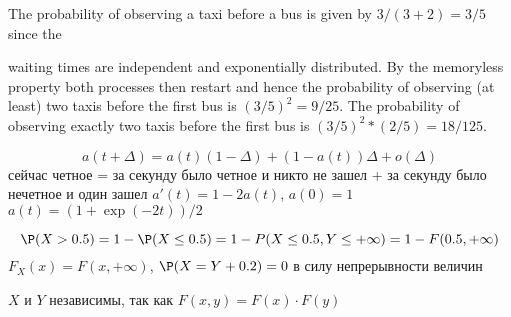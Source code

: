 \begin{solution}{7.7}
  The probability of observing a taxi before a bus is given by $3/(3+2)=3/5$ since the

  waiting times are independent and exponentially distributed. By the memoryless
  property both processes then restart and hence the probability of observing (at least)
  two taxis before the first bus is $(3/5)^2=9/25$. The probability of observing exactly
  two taxis before the first bus is $(3/5)^2*(2/5)=18/125$.
\end{solution}
\begin{solution}{7.8}
\end{solution}
\begin{solution}{7.9}
\end{solution}
\begin{solution}{7.10}
\end{solution}
\begin{solution}{7.11}
\end{solution}
\begin{solution}{7.12}
\end{solution}
\begin{solution}{7.13}
\end{solution}
\begin{solution}{7.14}
\end{solution}
\begin{solution}{7.15}
\end{solution}
\begin{solution}{7.16}
  \[ a(t+\Delta)=a(t)(1-\Delta)+(1-a(t))\Delta + o(\Delta) \]
  сейчас четное = за секунду было четное и никто не зашел + за секунду было нечетное и один зашел
  $a'(t)=1-2a(t)$, $a(0)=1$
  $a(t)=(1+\exp(-2t))/2$
\end{solution}
\begin{solution}{7.17}
\end{solution}
\begin{solution}{8.1}
\end{solution}
\begin{solution}{8.2}
\end{solution}
\begin{solution}{8.3}
\end{solution}
\begin{solution}{8.4}
\end{solution}
\begin{solution}{8.5}
  \[
  \P(X>0.5) = 1 - \P(X\leq 0.5) = 1 - P(X\leq 0.5, Y\leq +\infty) = 1 - F(0.5, +\infty)
  \]
  $F_X(x)=F(x, +\infty)$, $\P(X=Y+0.2)=0$ в силу непрерывности величин

  $X$ и $Y$ независимы, так как $F(x,y)=F(x)\cdot F(y)$
\end{solution}
